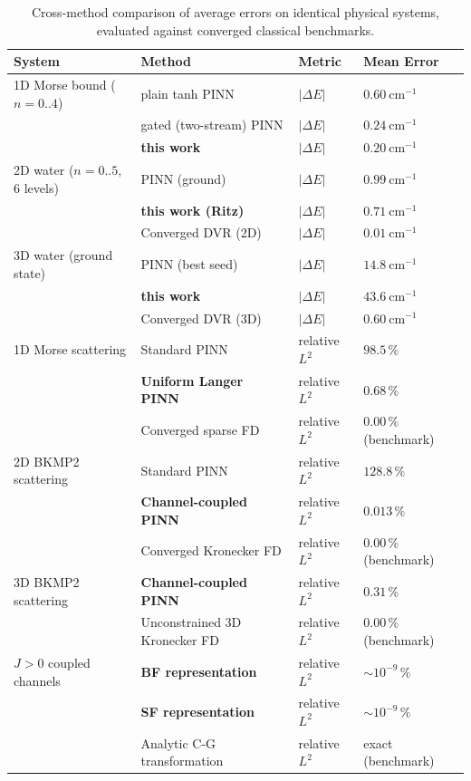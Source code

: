 \documentclass[11pt,a4paper]{article}
\newcommand{\cmi}{\ensuremath{\mathrm{cm}^{-1}}}
\begin{document}
\begin{table}[t]
\centering
\small
\setlength{\tabcolsep}{4pt}
\caption{Cross-method comparison of average errors on identical physical systems,
evaluated against converged classical benchmarks.}
\label{tab:method_comp}
\begin{tabular}{llll}
\toprule
System & Method & Metric & Mean Error \\
\midrule
1D Morse bound ($n{=}0..4$) & plain tanh PINN & $|\Delta E|$ & $0.60\ \cmi$ \\
 & gated (two-stream) PINN & $|\Delta E|$ & $0.24\ \cmi$ \\
 & \textbf{this work} & $|\Delta E|$ & $\mathbf{0.20}\ \cmi$ \\
\midrule
2D water ($n{=}0..5$, 6 levels) & PINN (ground) & $|\Delta E|$ & $0.99\ \cmi$ \\
 & \textbf{this work (Ritz)} & $|\Delta E|$ & $\mathbf{0.71}\ \cmi$ \\
 & Converged DVR (2D) & $|\Delta E|$ & $0.01\ \cmi$ \\
\midrule
3D water (ground state) & PINN (best seed) & $|\Delta E|$ & $14.8\ \cmi$ \\
 & \textbf{this work} & $|\Delta E|$ & $\mathbf{43.6}\ \cmi$ \\
 & Converged DVR (3D) & $|\Delta E|$ & $0.60\ \cmi$ \\
\midrule
1D Morse scattering & Standard PINN & relative $L^2$ & $98.5\,\%$ \\
 & \textbf{Uniform Langer PINN} & relative $L^2$ & $\mathbf{0.68}\,\%$ \\
 & Converged sparse FD & relative $L^2$ & $0.00\,\%$ (benchmark) \\
\midrule
2D BKMP2 scattering & Standard PINN & relative $L^2$ & $128.8\,\%$ \\
 & \textbf{Channel-coupled PINN} & relative $L^2$ & $\mathbf{0.013}\,\%$ \\
 & Converged Kronecker FD & relative $L^2$ & $0.00\,\%$ (benchmark) \\
\midrule
3D BKMP2 scattering & \textbf{Channel-coupled PINN} & relative $L^2$ & $\mathbf{0.31}\,\%$ \\
 & Unconstrained 3D Kronecker FD & relative $L^2$ & $0.00\,\%$ (benchmark) \\
\midrule
$J > 0$ coupled channels & \textbf{BF representation} & relative $L^2$ & $\sim 10^{-9}\,\%$ \\
 & \textbf{SF representation} & relative $L^2$ & $\sim 10^{-9}\,\%$ \\
 & Analytic C-G transformation & relative $L^2$ & exact (benchmark) \\
\bottomrule
\end{tabular}
\end{table}
\end{document}
